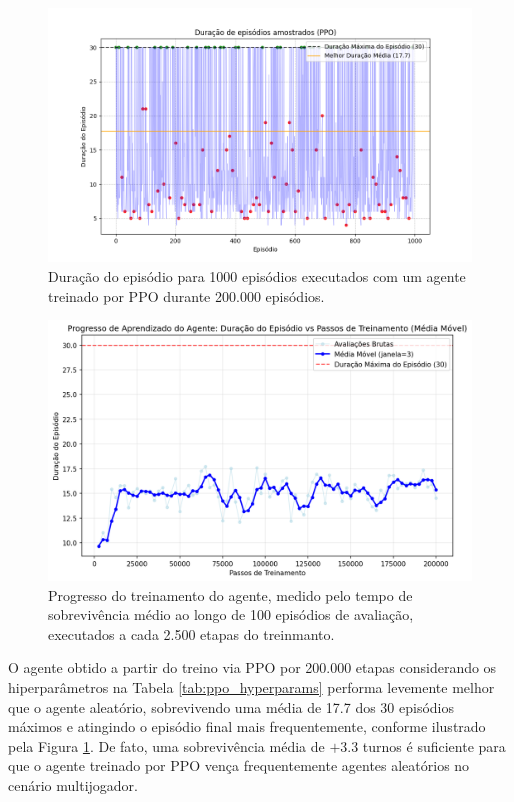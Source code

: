 \documentclass[conference]{IEEEtran}
\begin{document}
\begin{figure}[htpb]
    \centering
    \includegraphics[width=1\linewidth]{figures/episode_lengths_ppo.png}
    \caption{Duração do episódio para 1000 episódios executados com um agente treinado por PPO durante 200.000 episódios.}
    \label{fig:ep_lens_control}
\end{figure}

\begin{figure}[htpb]
    \centering
    \includegraphics[width=1\linewidth]{figures/eval_progress.png}
    \caption{Progresso do treinamento do agente, medido pelo tempo de sobrevivência médio ao longo de 100 episódios de avaliação, executados a cada 2.500 etapas do treinmanto.}
    \label{fig:eval_progress}
\end{figure}

O agente obtido a partir do treino via PPO por 200.000 etapas considerando os hiperparâmetros na Tabela \ref{tab:ppo_hyperparams} performa levemente melhor que o agente aleatório, sobrevivendo uma média de 17.7 dos 30 episódios máximos e atingindo o episódio final mais frequentemente, conforme ilustrado pela Figura \ref{fig:ep_lens_control}. De fato, uma sobrevivência média de $+3.3$ turnos é suficiente para que o agente treinado por PPO vença frequentemente agentes aleatórios no cenário multijogador.
\end{document}
